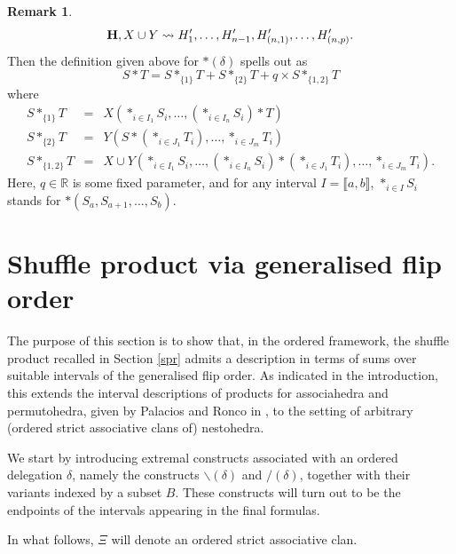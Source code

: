 \documentclass{article}
\theoremstyle{plain}
\theoremstyle{definition}
\newtheorem{remark}[thm]{Remark}
\newcommand{\set}[1]{\{#1\}}
\newcommand{\hyper}[1]{{\bf #1}}
\begin{document}
\begin{remark}
$$\hyper{H}, X\cup Y \leadsto H'_{1}, \ldots, H'_{n-1}, H'_{(n,1)}, \ldots, H'_{(n,p)}.$$
Then the definition given above for $\ast(\delta)$ spells out as
\begin{equation} \label{shuffle-antistrict-def} 
 S \ast T = S \ast_{\set{1}} T+S \ast_{\set{2}} T+q \times S \ast_{\set{1,2}} T 
\end{equation}
where
$$\begin{array}{rcl}
 S \ast_{\set{1}} T &= & X(\ast_{i \in I_1} S_{i}, \ldots, \left( \ast_{i \in I_n} S_{i} \right) \ast T ) \\
S \ast_{\set{2}} T &= & Y(S \ast \left(\ast_{i \in J_1} T_{i} \right), \ldots, \ast_{i \in J_m} T_{i} )\\
S \ast_{\set{1,2}} T &=& X \cup Y \left(\ast_{i \in I_1} S_{i}, \ldots, \left( \ast_{i \in I_n} S_{i}\right) \ast \left( \ast_{i \in J_1} T_{i}\right), \ldots, \ast_{i \in J_m} T_{i} \right).
\end{array}$$ 
Here, $q \in \mathbb{R}$ is some fixed parameter, and for any interval $I=\llbracket a,b\rrbracket$, $\ast_{i\in I} S_i$ stands for $\ast(S_a,S_{a+1},\ldots,S_b)$.
\end{remark}


 

 
\section{Shuffle product via generalised flip order} \label{shuffle-order-section}

The purpose of this section is to show that, in the ordered framework, the shuffle product
recalled in Section \ref{spr} admits a description in terms of sums over suitable intervals of the generalised
flip order. As indicated in the introduction, this extends the interval descriptions of products for associahedra and permutohedra, given by
Palacios and Ronco in \cite{PalaciosRonco}, to the setting
of arbitrary (ordered strict associative clans of) nestohedra.

 We start by introducing extremal constructs
associated with an ordered delegation $\delta$, namely the constructs
$\backslash(\delta)$ and $\slash(\delta)$, together with their
variants indexed by a subset $B$.
These constructs will turn out to be the endpoints of the intervals
appearing in the final formulas.

In what follows, $\Xi$ will denote an ordered strict associative clan.
 
\end{document}
